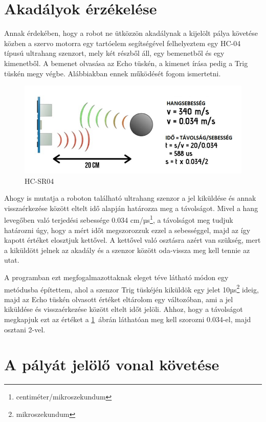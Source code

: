 \documentclass[]{thesis-ekf}
\theoremstyle{definition}
\begin{document}
\section{Akadályok érzékelése}
Annak érdekében, hogy a robot ne ütközzön akadálynak a kijelölt pálya követése közben a szervo motorra egy tartóelem segítségével felhelyeztem egy HC-04 típusú ultrahang szenzort, mely két részből áll, egy bemenetből és egy kimenetből. A bemenet olvasása az Echo tüskén, a kimenet írása pedig a Trig tüskén megy végbe. Alábbiakban ennek működését fogom ismertetni.
\begin{figure} [!h]
	\includegraphics[width=\columnwidth]{images/ultrasonic}
	\caption{HC-SR04}
	\label{ultrahang}
\end{figure}

Ahogy  is mutatja a roboton található ultrahang szenzor a jel kiküldése és annak visszaérkezése között eltelt idő alapján határozza meg a távolságot\cite{Ultrahang_Szenzor}. Mivel a hang levegőben való terjedési sebessége 0.034 cm/µs\footnote{centiméter/mikroszekundum}, a távolságot meg tudjuk határozni úgy, hogy a mért időt megszorozzuk ezzel a sebességgel, majd az így kapott értéket elosztjuk kettővel. A kettővel való osztásra azért van szükség, mert a kiküldött jelnek az akadály és a szenzor között oda-vissza meg kell tennie az utat.

A programban ezt  megfogalmazottaknak eleget téve  látható módon egy metódusba építettem, ahol a szenzor Trig tüskéjén kiküldök egy jelet 10µs\footnote{mikroszekundum} ideig, majd az Echo tüskén olvasott értéket eltárolom egy változóban, ami a jel kiküldése és visszaérkezése között eltelt időt jelöli. Ahhoz, hogy a távolságot megkapjuk ezt az értéket a \ref{ultrahang}~ábrán láthatóan meg kell szorozni 0.034-el, majd osztani 2-vel.

\section{A pályát jelölő vonal követése}

\end{document}
